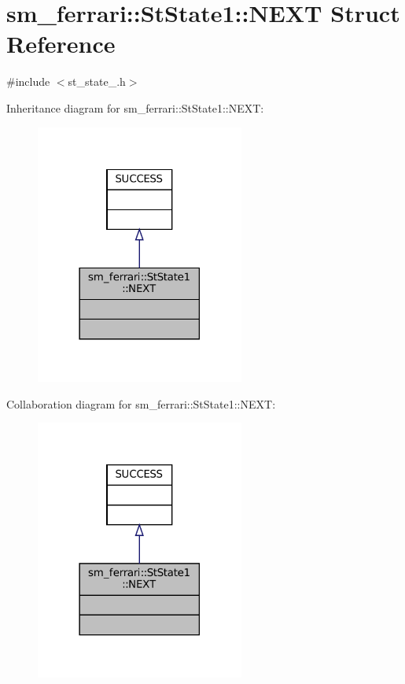 \hypertarget{structsm__ferrari_1_1StState1_1_1NEXT}{}\section{sm\+\_\+ferrari\+:\+:St\+State1\+:\+:N\+E\+XT Struct Reference}
\label{structsm__ferrari_1_1StState1_1_1NEXT}


{\ttfamily \#include $<$st\+\_\+state\+\_.\+h$>$}



Inheritance diagram for sm\+\_\+ferrari\+:\+:St\+State1\+:\+:N\+E\+XT\+:
\nopagebreak
\begin{figure}[H]
\begin{center}
\leavevmode
\includegraphics[width=194pt]{structsm__ferrari_1_1StState1_1_1NEXT__inherit__graph}
\end{center}
\end{figure}


Collaboration diagram for sm\+\_\+ferrari\+:\+:St\+State1\+:\+:N\+E\+XT\+:
\nopagebreak
\begin{figure}[H]
\begin{center}
\leavevmode
\includegraphics[width=194pt]{structsm__ferrari_1_1StState1_1_1NEXT__coll__graph}
\end{center}
\end{figure}


